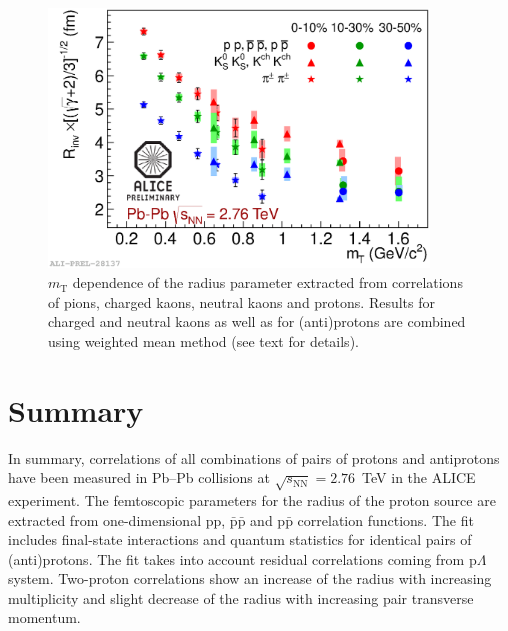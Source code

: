 \begin{figure}
  \centering
  \includegraphics[width=0.9\textwidth]{2012-Aug-08-RvsmTpiKpcombined}
  \caption{$m_{\mathrm{T}}$ dependence of the radius parameter extracted from correlations of pions, charged kaons, neutral kaons and protons. Results for charged and neutral kaons as well as for (anti)protons are combined using weighted mean method (see text for details).}
  \label{RinvvsmT}
\end{figure}

\section{Summary}
\label{sec:summary}
In summary, correlations of all combinations of pairs of protons and antiprotons have been measured in Pb--Pb collisions at $\sqrt{s_{\mathrm{NN}}}=2.76$~TeV in the ALICE experiment. The femtoscopic parameters for the radius of the proton source are extracted from one-dimensional pp, $\bar{\mathrm{p}}\bar{\mathrm{p}}$ and p$\bar{\mathrm{p}}$ correlation functions. The fit includes final-state interactions and quantum statistics for identical pairs of (anti)protons. The fit takes into account residual correlations coming from p$\Lambda$ system. Two-proton correlations show an increase of the radius with increasing multiplicity and slight decrease of the radius with increasing  pair transverse momentum. %

